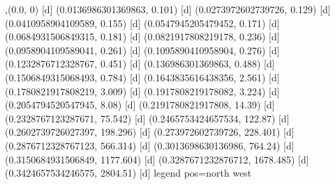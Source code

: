 {{{},{(0.0, 0) [d] 
(0.0136986301369863, 0.101) [d] 
(0.0273972602739726, 0.129) [d] 
(0.0410958904109589, 0.155) [d] 
(0.0547945205479452, 0.171) [d] 
(0.0684931506849315, 0.181) [d] 
(0.0821917808219178, 0.236) [d] 
(0.0958904109589041, 0.261) [d] 
(0.1095890410958904, 0.276) [d] 
(0.1232876712328767, 0.451) [d] 
(0.136986301369863, 0.488) [d] 
(0.1506849315068493, 0.784) [d] 
(0.1643835616438356, 2.561) [d] 
(0.1780821917808219, 3.009) [d] 
(0.1917808219178082, 3.224) [d] 
(0.2054794520547945, 8.08) [d] 
(0.2191780821917808, 14.39) [d] 
(0.2328767123287671, 75.542) [d] 
(0.2465753424657534, 122.87) [d] 
(0.2602739726027397, 198.296) [d] 
(0.273972602739726, 228.401) [d] 
(0.2876712328767123, 566.314) [d] 
(0.3013698630136986, 764.24) [d] 
(0.3150684931506849, 1177.604) [d] 
(0.3287671232876712, 1678.485) [d] 
(0.3424657534246575, 2804.51) [d] 
}}}{legend pos=north west}